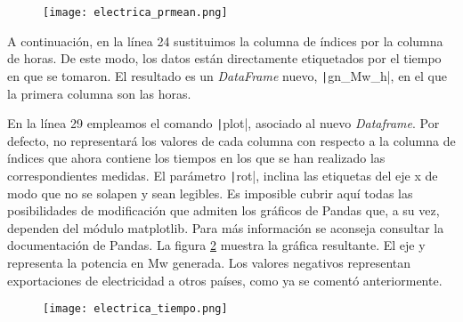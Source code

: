\begin{figure}
	\centering
	\texttt{[image: electrica\_prmean.png]}
	\label{fig:pastm}
\end{figure}
\begin{paracol}{2}
	A continuación, en la línea 24 sustituimos la columna de índices por la columna de horas. De este modo, los datos están directamente etiquetados por el tiempo en que se tomaron. El resultado es un \emph{DataFrame} nuevo, \texttt|gn_Mw_h|, en el que la primera columna son las horas.
	
	En la línea 29 empleamos el comando \texttt|plot|, asociado al nuevo \emph{Dataframe}. Por defecto, no representará los valores de cada columna con respecto a la columna de índices que ahora contiene los tiempos en los que se han realizado las correspondientes medidas. El parámetro \texttt|rot|, inclina las etiquetas del eje x de modo que no se solapen y sean legibles. Es imposible cubrir aquí todas las posibilidades de modificación que admiten los gráficos de Pandas que, a su vez, dependen del módulo matplotlib. Para más información se aconseja consultar la documentación de Pandas. La figura \ref{fig:datosele}
	muestra la gráfica resultante. El eje y representa la potencia en Mw generada. Los valores negativos representan exportaciones de electricidad a otros países, como ya se comentó anteriormente.
\end{paracol}
\begin{figure}
	\centering
	\texttt{[image: electrica\_tiempo.png]}
	\label{fig:datosele}
\end{figure}


